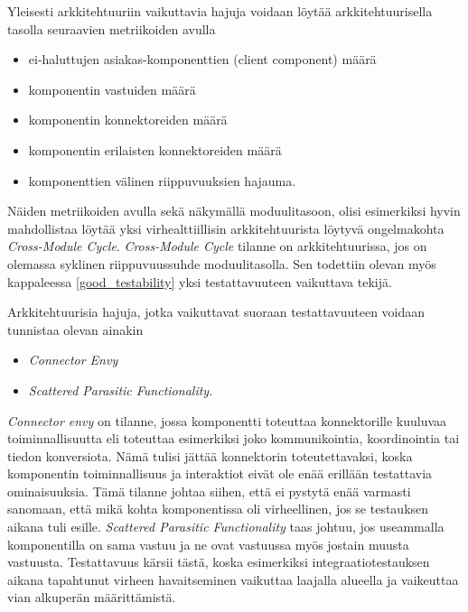 \documentclass[finnish]{tktltiki2}
\theoremstyle{definition}
\theoremstyle{remark}
\begin{document}

Yleisesti arkkitehtuuriin vaikuttavia hajuja voidaan löytää arkkitehtuurisella tasolla seuraavien metriikoiden avulla \citep{bertran_detecting_2011}

\begin{itemize}
	\item ei-haluttujen asiakas-komponenttien (client component) määrä
	\item komponentin vastuiden määrä
	\item komponentin konnektoreiden määrä
	\item komponentin erilaisten konnektoreiden määrä
	\item komponenttien välinen riippuvuuksien hajauma.
\end{itemize}


\noindent
Näiden metriikoiden avulla sekä näkymällä moduulitasoon, olisi esimerkiksi hyvin mahdollistaa löytää yksi virhealttiillisin arkkitehtuurista löytyvä ongelmakohta \citep[s. 57]{HotSpot} \textit{Cross-Module Cycle}. \textit{Cross-Module Cycle} tilanne on arkkitehtuurissa, jos on olemassa syklinen riippuvuussuhde moduulitasolla. Sen todettiin olevan myös kappaleessa \ref{good_testability} yksi testattavuuteen vaikuttava tekijä.


Arkkitehtuurisia hajuja, jotka vaikuttavat suoraan testattavuuteen voidaan tunnistaa olevan ainakin \citep{garcia_identifying_2009}

\begin{itemize}
	\item \textit{Connector Envy}
	\item \textit{Scattered Parasitic Functionality}.
\end{itemize}

\noindent
\textit{Connector envy} on tilanne, jossa komponentti toteuttaa konnektorille kuuluvaa toiminnallisuutta eli toteuttaa esimerkiksi joko kommunikointia, koordinointia tai tiedon konversiota. Nämä tulisi jättää konnektorin toteutettavaksi, koska komponentin toiminnallisuus ja interaktiot eivät ole enää erillään testattavia ominaisuuksia. Tämä tilanne johtaa siihen, että ei pystytä enää varmasti sanomaan, että mikä kohta komponentissa oli virheellinen, jos se testauksen aikana tuli esille. \textit{Scattered Parasitic Functionality} taas johtuu, jos useammalla komponentilla on sama vastuu ja ne ovat vastuussa myös jostain muusta vastuusta. Testattavuus kärsii tästä, koska esimerkiksi integraatiotestauksen aikana tapahtunut virheen havaitseminen vaikuttaa laajalla alueella ja vaikeuttaa vian alkuperän määrittämistä. 
\end{document}
